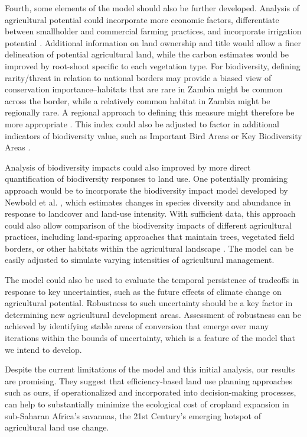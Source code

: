 \documentclass[a4paper]{article}
\begin{document}
{Fourth, some elements of the model should also be further developed. Analysis of agricultural potential could incorporate more economic factors, differentiate between smallholder and commercial farming practices, and incorporate irrigation potential \citep[e.g.][]{nijbroek_regional_2016}. Additional information on land ownership and title would allow a finer delineation of potential agricultural land, while the carbon estimates would be improved by root-shoot specific to each vegetation type. For biodiversity, defining rarity/threat in relation to national borders may provide a biased view of conservation importance--habitats that are rare in Zambia might be common across the border, while a relatively common habitat in Zambia might be regionally rare. A regional approach to defining this measure might therefore be more appropriate \citep[e.g.][]{van_breugel_environmental_2015}. This index could also be adjusted to factor in additional indicators of biodiversity value, such as Important Bird Areas \citep{butchart_protecting_2012} or Key Biodiversity Areas \citep{eken_key_2004}. 

Analysis of biodiversity impacts could also improved by more direct quantification of biodiversity responses to land use. One potentially promising approach would be to incorporate the biodiversity impact model developed by Newbold et al. \citep{newbold_global_2015}, which estimates changes in species diversity and abundance in response to landcover and land-use intensity. With sufficient data, this approach could also allow comparison of the biodiversity impacts of different agricultural practices, including land-sparing approaches that maintain trees, vegetated field borders, or other habitats within the agricultural landscape \citep{kremen_reframing_2015}. The model can be easily adjusted to simulate varying intensities of agricultural management. 

The model could also be used to evaluate the temporal persistence of tradeoffs in response to key uncertainties, such as the future effects of climate change on agricultural potential. Robustness to such uncertainty should be a key factor in determining new agricultural development areas. Assessment of robustness can be achieved by identifying stable areas of conversion that emerge over many iterations within the bounds of uncertainty, which is a feature of the model that we intend to develop.  

Despite the current limitations of the model and this initial analysis, our results are promising. They suggest that efficiency-based land use planning approaches such as ours, if operationalized and incorporated into decision-making processes, can help to substantially minimize the ecological cost of cropland expansion in sub-Saharan Africa's savannas, the 21st Century's emerging hotspot of agricultural land use change. 

}
\end{document}
